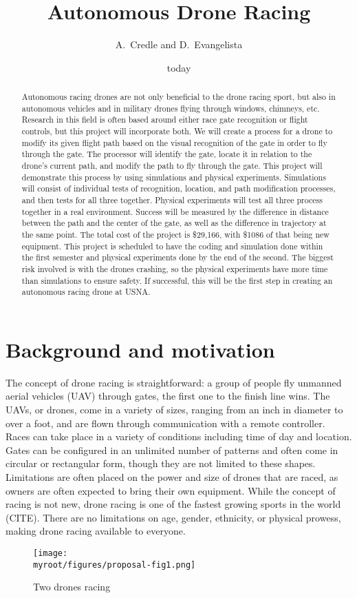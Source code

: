 \documentclass[onecolumn,10pt]{IEEEtran}
\title{Autonomous Drone Racing}
\author{A.~Credle and D.~Evangelista}
\date{today}
\newcommand{\myroot}{../}
\begin{document}
\maketitle

\begin{abstract}
Autonomous racing drones are not only beneficial to the drone racing sport, but also in autonomous vehicles and in military drones flying through windows, chimneys, etc. Research in this field is often based around either race gate recognition or flight controls, but this project will incorporate both. We will create a process for a drone to modify its given flight path based on the visual recognition of the gate in order to fly through the gate. The processor will identify the gate, locate it in relation to the drone’s current path, and modify the path to fly through the gate. This project will demonstrate this process by using simulations and physical experiments. Simulations will consist of individual tests of recognition, location, and path modification processes, and then tests for all three together. Physical experiments will test all three process together in a real environment. Success will be measured by the difference in distance between the path and the center of the gate, as well as the difference in trajectory at the same point. The total cost of the project is \$29,166, with \$1086 of that being new equipment. This project is scheduled to have the coding and simulation done within the first semester and physical experiments done by the end of the second. The biggest risk involved is with the drones crashing, so the physical experiments have more time than simulations to ensure safety. If successful, this will be the first step in creating an autonomous racing drone at USNA.
\end{abstract}

\section{Background and motivation}
The concept of drone racing is straightforward: a group of people fly unmanned aerial vehicles (UAV) through gates, the first one to the finish line wins. The UAVs, or drones, come in a variety of sizes, ranging from an inch in diameter to over a foot, and are flown through communication with a remote controller. Races can take place in a variety of conditions including time of day and location. Gates can be configured in an unlimited number of patterns and often come in circular or rectangular form, though they are not limited to these shapes. Limitations are often placed on the power and size of drones that are raced, as owners are often expected to bring their own equipment. While the concept of racing is not new, drone racing is one of the fastest growing sports in the world (CITE). There are no limitations on age, gender, ethnicity, or physical prowess, making drone racing available to everyone.
\begin{figure}
\begin{center}
\texttt{[image: \\myroot/figures/proposal-fig1.png]}
\end{center}
\caption{Two drones racing}
\label{fig1}
\end{figure}
\end{document}
